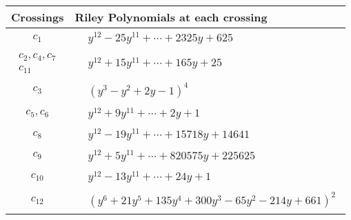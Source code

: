 \documentclass[1p]{elsarticle_modified}
\theoremstyle{definition}
\begin{document}
\begin{tabular}{m{50pt}|m{274pt}}
Crossings & \hspace{64pt}Riley Polynomials at each crossing \\
\hline $$\begin{aligned}c_{1}\end{aligned}$$&$\begin{aligned}
&y^{12}-25 y^{11}+\cdots+2325 y+625
\end{aligned}$\\
\hline $$\begin{aligned}c_{2},c_{4},c_{7}\\c_{11}\end{aligned}$$&$\begin{aligned}
&y^{12}+15 y^{11}+\cdots+165 y+25
\end{aligned}$\\
\hline $$\begin{aligned}c_{3}\end{aligned}$$&$\begin{aligned}
&(y^3- y^2+2 y-1)^4
\end{aligned}$\\
\hline $$\begin{aligned}c_{5},c_{6}\end{aligned}$$&$\begin{aligned}
&y^{12}+9 y^{11}+\cdots+2 y+1
\end{aligned}$\\
\hline $$\begin{aligned}c_{8}\end{aligned}$$&$\begin{aligned}
&y^{12}-19 y^{11}+\cdots+15718 y+14641
\end{aligned}$\\
\hline $$\begin{aligned}c_{9}\end{aligned}$$&$\begin{aligned}
&y^{12}+5 y^{11}+\cdots+820575 y+225625
\end{aligned}$\\
\hline $$\begin{aligned}c_{10}\end{aligned}$$&$\begin{aligned}
&y^{12}-13 y^{11}+\cdots+24 y+1
\end{aligned}$\\
\hline $$\begin{aligned}c_{12}\end{aligned}$$&$\begin{aligned}
&(y^6+21 y^5+135 y^4+300 y^3-65 y^2-214 y+661)^2
\end{aligned}$\\
\hline
\end{tabular}\\~\\
\end{document}
